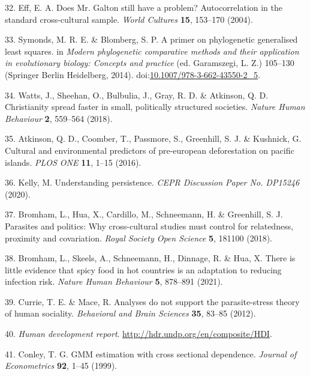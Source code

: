 \documentclass[
  english,
  man,floatsintext]{apa6}
\begin{document}
\leavevmode\hypertarget{ref-Eff2004}{}%
32. Eff, E. A. Does Mr. Galton still have a problem? Autocorrelation in the standard cross-cultural sample. \emph{World Cultures} \textbf{15}, 153--170 (2004).

\leavevmode\hypertarget{ref-Symonds2014}{}%
33. Symonds, M. R. E. \& Blomberg, S. P. A primer on phylogenetic generalised least squares. in \emph{Modern phylogenetic comparative methods and their application in evolutionary biology: Concepts and practice} (ed. Garamszegi, L. Z.) 105--130 (Springer Berlin Heidelberg, 2014). doi:\href{https://doi.org/10.1007/978-3-662-43550-2_5}{10.1007/978-3-662-43550-2\_5}.

\leavevmode\hypertarget{ref-Watts2018}{}%
34. Watts, J., Sheehan, O., Bulbulia, J., Gray, R. D. \& Atkinson, Q. D. Christianity spread faster in small, politically structured societies. \emph{Nature Human Behaviour} \textbf{2}, 559--564 (2018).

\leavevmode\hypertarget{ref-Atkinson2016}{}%
35. Atkinson, Q. D., Coomber, T., Passmore, S., Greenhill, S. J. \& Kushnick, G. Cultural and environmental predictors of pre-european deforestation on pacific islands. \emph{PLOS ONE} \textbf{11}, 1--15 (2016).

\leavevmode\hypertarget{ref-Kelly2020}{}%
36. Kelly, M. Understanding persistence. \emph{CEPR Discussion Paper No. DP15246} (2020).

\leavevmode\hypertarget{ref-Bromham2018}{}%
37. Bromham, L., Hua, X., Cardillo, M., Schneemann, H. \& Greenhill, S. J. Parasites and politics: Why cross-cultural studies must control for relatedness, proximity and covariation. \emph{Royal Society Open Science} \textbf{5}, 181100 (2018).

\leavevmode\hypertarget{ref-Bromham2021}{}%
38. Bromham, L., Skeels, A., Schneemann, H., Dinnage, R. \& Hua, X. There is little evidence that spicy food in hot countries is an adaptation to reducing infection risk. \emph{Nature Human Behaviour} \textbf{5}, 878--891 (2021).

\leavevmode\hypertarget{ref-Currie2012}{}%
39. Currie, T. E. \& Mace, R. Analyses do not support the parasite-stress theory of human sociality. \emph{Behavioral and Brain Sciences} \textbf{35}, 83--85 (2012).

\leavevmode\hypertarget{ref-hdi}{}%
40. \emph{Human development report}. \url{http://hdr.undp.org/en/composite/HDI}.

\leavevmode\hypertarget{ref-Conley1999}{}%
41. Conley, T. G. GMM estimation with cross sectional dependence. \emph{Journal of Econometrics} \textbf{92}, 1--45 (1999).
\end{document}
